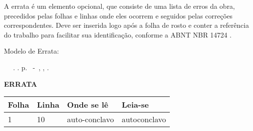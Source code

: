 \begin{errata}
	A errata \'e um elemento opcional, que consiste de uma lista de erros da obra, precedidos pelas folhas e linhas onde eles ocorrem e seguidos pelas corre\c{c}\~oes correspondentes. Deve ser inserida logo ap\'os a folha de rosto e conter a refer\^encia do trabalho para facilitar sua identifica\c{c}\~ao, conforme a ABNT NBR 14724 \cite{nbr14724}.
	
	Modelo de Errata:
		
	\begin{flushleft} 
			\setlength{\absparsep}{0pt} %
			\SingleSpacing 
			\imprimirautorabr~ ~\textbf{\imprimirtituloresumo}.	\imprimirdata. \pageref{LastPage}p. 
			\imprimirtipotrabalho~-~\imprimirinstituicao, \imprimirlocal, \imprimirdata. 
 	\end{flushleft}
\vspace{\onelineskip}
\OnehalfSpacing 
\center
\textbf{ERRATA}
\vspace{\onelineskip}
\OnehalfSpacing 
\begin{table}[Htb]
	\center
	\footnotesize
	\begin{tabular}{p{2cm} p{2cm} p{4cm} p{4cm} }
		\hline
		\textbf{Folha} & \textbf{Linha}  & \textbf{Onde se l\^e}  & \textbf{Leia-se}  \\
			\hline
			1 & 10 & auto-conclavo & autoconclavo\\
		\hline
	\end{tabular}
\end{table}
\end{errata}
